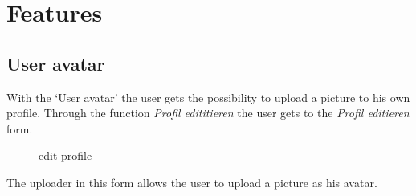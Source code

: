 \chapter{Features}\label{chap:features}





\section{User avatar}
With the `User avatar' the user gets the possibility to upload a picture to his own profile. Through the function \textit{Profil edititieren}  the user gets to the \textit{Profil editieren} form. 
\pagebreak

\begin{figure}[!h]
  \centering
  \caption{edit profile}
  \label{fig:profil_editieren}
\end{figure}

The uploader in this form allows the user to upload a picture as his avatar.

\pagebreak

